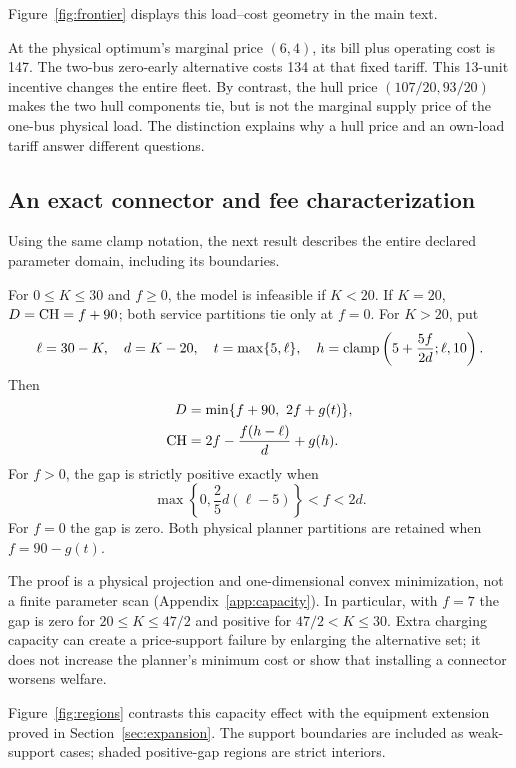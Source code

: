 Figure~\ref{fig:frontier} displays this load--cost geometry in the main text.

At the physical optimum's marginal price $(6,4)$, its bill plus operating
cost is 147. The two-bus zero-early alternative costs 134 at that fixed
tariff. This 13-unit incentive changes the entire fleet. By contrast, the
hull price $(107/20,93/20)$ makes the two hull components tie, but is not
the marginal supply price of the one-bus physical load. The distinction
explains why a hull price and an own-load tariff answer different questions.

\subsection{An exact connector and fee characterization}
Using the same clamp notation, the next result describes the entire
declared parameter domain, including its boundaries.

\begin{theorem}\label{thm:capacity}
For $0\le K\le30$ and $f\ge0$, the model is infeasible if $K<20$.
If $K=20$, $D=\mathrm{CH}=f+90$; both service partitions tie only at $f=0$.
For $K>20$, put
\[
 \ell=30-K,\quad d=K-20,\quad t=\max\{5,\ell\},\quad
 h=\operatorname{clamp}\left(5+\frac{5f}{2d};\ell,10\right).
\]
Then
\begin{align}
 D&=\min\{f+90,\ 2f+g(t)\},\label{eq:capacityD}\\
 \mathrm{CH}&=2f-\frac{f(h-\ell)}d+g(h).\label{eq:capacityCH}
\end{align}
For $f>0$, the gap is strictly positive exactly when
\begin{equation}\label{eq:capacityregion}
 \max\left\{0,\frac25d(\ell-5)\right\}<f<2d.
\end{equation}
For $f=0$ the gap is zero. Both physical planner partitions are retained
when $f=90-g(t)$.
\end{theorem}

The proof is a physical projection and one-dimensional convex minimization,
not a finite parameter scan (Appendix~\ref{app:capacity}). In particular,
with $f=7$ the gap is zero for $20\le K\le47/2$ and positive for
$47/2<K\le30$. Extra charging capacity can create a price-support failure
by enlarging the alternative set; it does not increase the planner's minimum
cost or show that installing a connector worsens welfare.

Figure~\ref{fig:regions} contrasts this capacity effect with the equipment
extension proved in Section~\ref{sec:expansion}. The support boundaries are
included as weak-support cases; shaded positive-gap regions are strict interiors.

